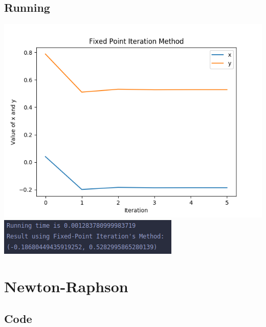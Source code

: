 \documentclass[12pt]{article}
\begin{document}
      \subsection*{Running}
        \begin{center}
          \includegraphics{FixedPointIteration.png}
          \includegraphics{FixedPointResult.png}
        \end{center}
    \section*{Newton-Raphson}
      \subsection*{Code}
\end{document}
